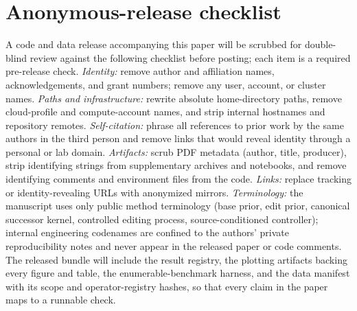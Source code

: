 \section{Anonymous-release checklist}
\label{app:repromap}

A code and data release accompanying this paper will be scrubbed for double-blind review against the
following checklist before posting; each item is a required pre-release check. \emph{Identity:} remove
author and affiliation names, acknowledgements, and grant numbers; remove any user, account, or cluster
names. \emph{Paths and infrastructure:} rewrite absolute home-directory paths, remove cloud-profile and
compute-account names, and strip internal hostnames and repository remotes. \emph{Self-citation:} phrase
all references to prior work by the same authors in the third person and remove links that would reveal
identity through a personal or lab domain. \emph{Artifacts:} scrub PDF metadata (author, title, producer),
strip identifying strings from supplementary archives and notebooks, and remove identifying comments and
environment files from the code. \emph{Links:} replace tracking or identity-revealing URLs with anonymized
mirrors. \emph{Terminology:} the manuscript uses only public method terminology (base prior, edit prior,
canonical successor kernel, controlled editing process, source-conditioned controller); internal
engineering codenames are confined to the authors' private reproducibility notes and never appear in the
released paper or code comments. The released bundle will include the result registry, the plotting
artifacts backing every figure and table, the enumerable-benchmark harness, and the data manifest with its
scope and operator-registry hashes, so that every claim in the paper maps to a runnable check.
